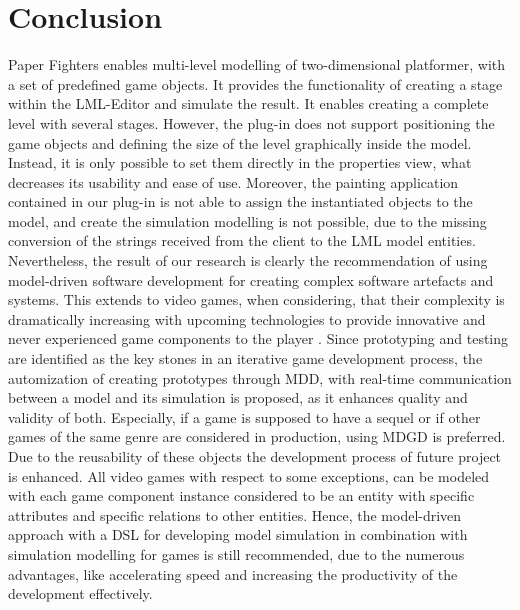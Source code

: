\chapter{Conclusion}
Paper Fighters enables multi-level modelling of two-dimensional platformer, with a set of predefined game objects. It provides the functionality of creating a stage within the LML-Editor and simulate the result.
It enables creating a complete level with several stages.
However, the plug-in does not support positioning the game objects and defining the size of the level graphically inside the model. Instead, it is only possible to set them directly in the properties view, what decreases its usability and ease of use. Moreover, the painting application contained in our plug-in is not able to assign the instantiated objects to the model, and create the simulation modelling is not possible, due to the missing conversion of the strings received from the client to the LML model entities.
Nevertheless, the result of our research is clearly the recommendation of using model-driven software development for creating complex software artefacts and systems. This extends to video games, when considering, that their complexity is dramatically increasing with upcoming technologies to provide innovative and never experienced game components to the player \cite{Blow:2004:GDH:971564.971590}. Since prototyping and testing are identified as the key stones in an iterative game development process\cite{reyno2009automatic}, the automization of creating prototypes through MDD, with real-time communication between a model and its simulation is proposed, as it enhances quality and validity of both. Especially, if a game is supposed to have a sequel or if other games of the same genre are considered in production, using MDGD is preferred. Due to the reusability of these objects the development process of future project is enhanced. All video games with respect to some exceptions, can be modeled with each game component instance considered to be an entity with specific attributes and specific relations to other entities. Hence, the model-driven approach with a DSL for developing model simulation in combination with simulation modelling for games is still recommended, due to the numerous advantages, like accelerating speed and increasing the productivity of the development effectively.